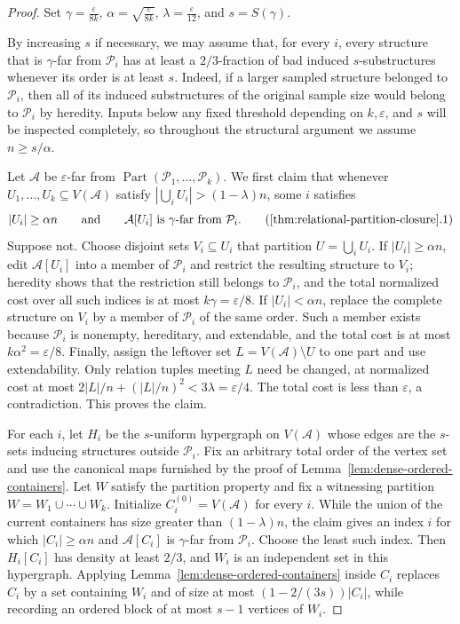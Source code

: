 \documentclass[11pt,reqno,letterpaper]{amsart}
\newcommand{\Part}{\operatorname{Part}}
\newcommand{\cA}{{\mathcal A}}
\newcommand{\cP}{{\mathcal P}}
\theoremstyle{plain}
\theoremstyle{remark}
\begin{document}
\begin{proof}
Set
\(\gamma=\frac{\varepsilon}{8k}\),
\(\alpha=\sqrt{\frac{\varepsilon}{8k}}\),
\(\lambda=\frac{\varepsilon}{12}\), and \(s=S(\gamma)\). 

By increasing $s$ if necessary, we may assume that, for every $i$, every
structure that is $\gamma$-far from $\cP_i$ has at least a $2/3$-fraction of
bad induced $s$-substructures whenever its order is at least $s$.  Indeed, if a
larger sampled structure belonged to $\cP_i$, then all of its induced
substructures of the original sample size would belong to $\cP_i$ by
heredity.  Inputs below
any fixed threshold depending on $k,\varepsilon$, and $s$ will be inspected
completely, so throughout the structural argument we assume
$n\geq s/\alpha$.

Let $\cA$ be $\varepsilon$-far from
$\Part(\cP_1,\dots,\cP_k)$.  We first claim that whenever
$U_1,\dots,U_k\subseteq V(\cA)$ satisfy
$|\bigcup_iU_i|>(1-\lambda)n$, some $i$ satisfies
\[
|U_i|\geq\alpha n
\qquad\text{and}\qquad
\cA[U_i]\text{ is }\gamma\text{-far from }\cP_i.
\tag{\ref{thm:relational-partition-closure}.1}
\]
Suppose not.  Choose disjoint sets $V_i\subseteq U_i$ that partition
$U=\bigcup_iU_i$.  If $|U_i|\geq\alpha n$, edit $\cA[U_i]$ into a member of
$\cP_i$ and restrict the resulting structure to $V_i$; heredity shows that the
restriction still belongs to $\cP_i$, and the total normalized cost over all
such indices is at most $k\gamma=\varepsilon/8$.  If
$|U_i|<\alpha n$, replace the complete structure on $V_i$ by a member of
$\cP_i$ of the same order.  Such a member exists because $\cP_i$ is nonempty,
hereditary, and extendable, and the total cost is at most
$k\alpha^2=\varepsilon/8$.  Finally, assign the leftover set
$L=V(\cA)\setminus U$ to one part and use extendability.  Only relation tuples
meeting $L$ need be changed, at normalized cost at most
$2|L|/n+(|L|/n)^2<3\lambda=\varepsilon/4$.  The total cost is less than
$\varepsilon$, a contradiction.  This proves the claim.

For each $i$, let $H_i$ be the $s$-uniform hypergraph on $V(\cA)$ whose edges
are the $s$-sets inducing structures outside $\cP_i$.  Fix an arbitrary total
order of the vertex set and use the canonical maps furnished by the proof of
Lemma~\ref{lem:dense-ordered-containers}.  Let $W$ satisfy the partition
property and fix a witnessing partition
$W=W_1\cup\cdots\cup W_k$.  Initialize $C_i^{(0)}=V(\cA)$ for every $i$.
While the union of the current containers has size greater than
$(1-\lambda)n$, the claim gives an index $i$ for which
$|C_i|\geq\alpha n$ and $\cA[C_i]$ is $\gamma$-far from $\cP_i$.  Choose the
least such index.  Then $H_i[C_i]$ has density at least $2/3$, and $W_i$ is an
independent set in this hypergraph.  Applying
Lemma~\ref{lem:dense-ordered-containers} inside $C_i$ replaces $C_i$ by a set
containing $W_i$ and of size at most
\((1-2/(3s))|C_i|\), while recording an ordered block of at most $s-1$
vertices of $W_i$.


\end{proof}
\end{document}
